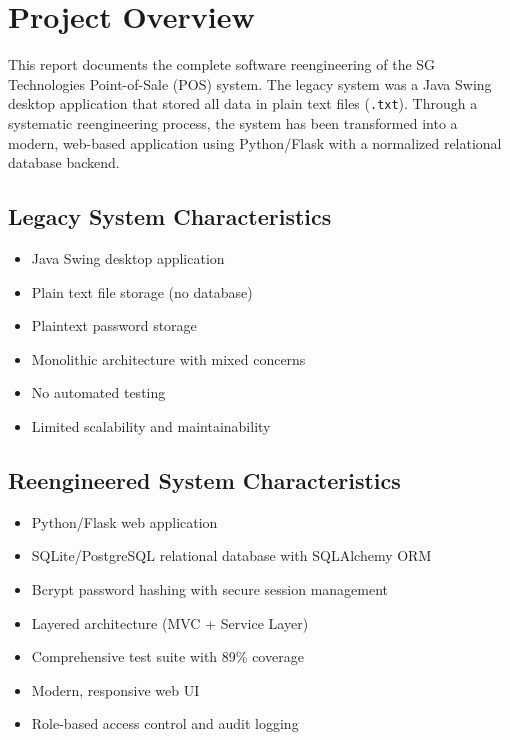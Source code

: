 \documentclass[12pt,a4paper]{report}
\begin{document}
\chapter*{Project Overview}

This report documents the complete software reengineering of the SG Technologies
Point-of-Sale (POS) system. The legacy system was a Java Swing desktop application
that stored all data in plain text files (\texttt{.txt}). Through a systematic
reengineering process, the system has been transformed into a modern, web-based
application using Python/Flask with a normalized relational database backend.

\section*{Legacy System Characteristics}
\begin{itemize}[leftmargin=1.2cm]
  \item Java Swing desktop application
  \item Plain text file storage (no database)
  \item Plaintext password storage
  \item Monolithic architecture with mixed concerns
  \item No automated testing
  \item Limited scalability and maintainability
\end{itemize}

\section*{Reengineered System Characteristics}
\begin{itemize}[leftmargin=1.2cm]
  \item Python/Flask web application
  \item SQLite/PostgreSQL relational database with SQLAlchemy ORM
  \item Bcrypt password hashing with secure session management
  \item Layered architecture (MVC + Service Layer)
  \item Comprehensive test suite with 89\% coverage
  \item Modern, responsive web UI
  \item Role-based access control and audit logging
\end{itemize}
\end{document}
